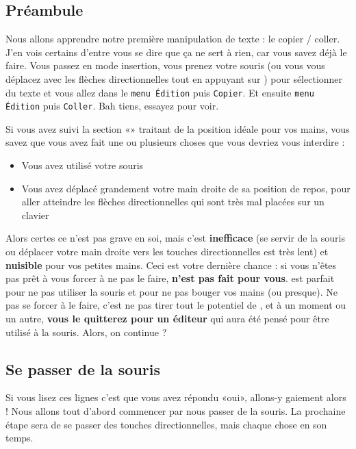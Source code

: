 \subsection{Préambule}

Nous allons apprendre notre première manipulation de texte : le copier / coller. J'en vois certains d'entre vous se dire que ça ne sert à rien, car vous savez déjà le faire. Vous passez en mode insertion, vous prenez votre souris (ou vous vous déplacez avec les flèches directionnelles tout en appuyant sur \ttshift) pour sélectionner du texte et vous allez dans le \Verb|menu Édition| puis \Verb|Copier|. Et ensuite \Verb|menu Édition| puis \Verb|Coller|. Bah tiens, essayez pour voir.

Si vous avez suivi la section «» traitant de la position idéale pour vos mains, vous savez que vous avez fait une ou plusieurs choses que vous devriez vous interdire :


\begin{itemize}
    \item Vous avez utilisé votre souris
    \item Vous avez déplacé grandement votre main droite de sa position de repos, pour aller atteindre les flèches directionnelles qui sont très mal placées sur un clavier
\end{itemize}


Alors certes ce n'est pas grave en soi, mais c'est \textbf{inefficace} (se servir de la souris ou déplacer votre main droite vers les touches directionnelles est très lent) et \textbf{nuisible} pour vos petites mains. Ceci est votre dernière chance : si vous n'êtes pas prêt à vous forcer à ne pas le faire, \textbf{\vim n'est pas fait pour vous}. \vim est parfait pour ne pas utiliser la souris et pour ne pas bouger vos mains (ou presque). Ne pas se forcer à le faire, c'est ne pas tirer tout le potentiel de \vim, et à un moment ou un autre, \textbf{vous le quitterez pour un éditeur} qui aura été pensé pour être utilisé à la souris. Alors, on continue ?

\subsection{Se passer de la souris}

Si vous lisez ces lignes c'est que vous avez répondu «oui», allons-y gaiement alors ! Nous allons tout d'abord commencer par nous passer de la souris. La prochaine étape sera de se passer des touches directionnelles, mais chaque chose en son temps.


